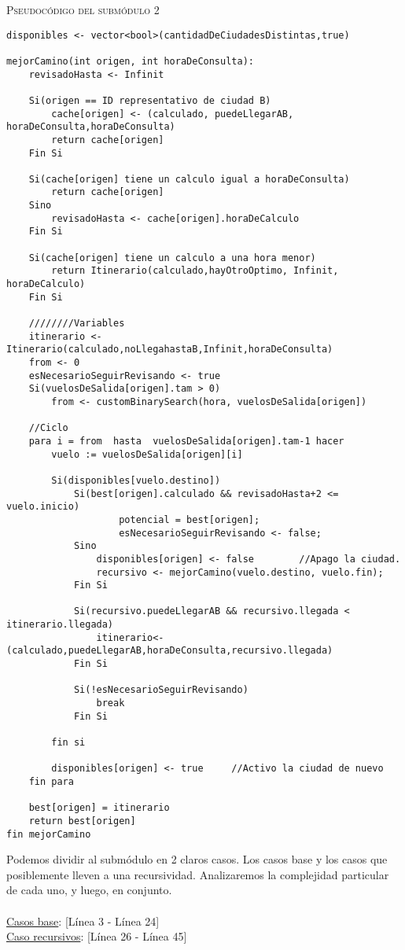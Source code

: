 \textsc{Pseudocódigo del submódulo 2}

\begin{lstlisting}
disponibles <- vector<bool>(cantidadDeCiudadesDistintas,true)

mejorCamino(int origen, int horaDeConsulta):
	revisadoHasta <- Infinit	
	
	Si(origen == ID representativo de ciudad B)
		cache[origen] <- (calculado, puedeLlegarAB, horaDeConsulta,horaDeConsulta)
		return cache[origen]
	Fin Si
	
	Si(cache[origen] tiene un calculo igual a horaDeConsulta)
		return cache[origen]	
	Sino
		revisadoHasta <- cache[origen].horaDeCalculo
	Fin Si
	
	Si(cache[origen] tiene un calculo a una hora menor)
	 	return Itinerario(calculado,hayOtroOptimo, Infinit, horaDeCalculo)
	Fin Si
	
	////////Variables
	itinerario <- Itinerario(calculado,noLlegahastaB,Infinit,horaDeConsulta)
	from <- 0
	esNecesarioSeguirRevisando <- true
	Si(vuelosDeSalida[origen].tam > 0)
		from <- customBinarySearch(hora, vuelosDeSalida[origen])
	
	//Ciclo
	para i = from  hasta  vuelosDeSalida[origen].tam-1 hacer
		vuelo := vuelosDeSalida[origen][i]

		Si(disponibles[vuelo.destino])
			Si(best[origen].calculado && revisadoHasta+2 <= vuelo.inicio)
					potencial = best[origen];
					esNecesarioSeguirRevisando <- false;
			Sino			
				disponibles[origen] <- false		//Apago la ciudad.
				recursivo <- mejorCamino(vuelo.destino, vuelo.fin);
			Fin Si
			
			Si(recursivo.puedeLlegarAB && recursivo.llegada < itinerario.llegada)
				itinerario<-(calculado,puedeLlegarAB,horaDeConsulta,recursivo.llegada)
			Fin Si
			
			Si(!esNecesarioSeguirRevisando)
				break
			Fin Si
			
		fin si
		
		disponibles[origen] <- true		//Activo la ciudad de nuevo
	fin para
	
	best[origen] = itinerario
	return best[origen]
fin mejorCamino
\end{lstlisting}

Podemos dividir al submódulo en 2 claros casos. Los casos base y los casos que posiblemente lleven a una recursividad. Analizaremos la complejidad particular de cada uno, y luego, en conjunto.\\ \\
\underline{Casos base}: [Línea 3 - Línea 24] \\
\underline{Caso recursivos}: [Línea 26 - Línea 45]\\

